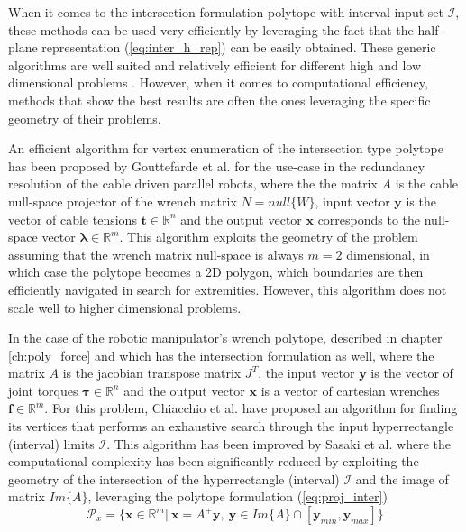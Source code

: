 When it comes to the intersection formulation polytope with interval input set $\mathcal{I}$, these methods can be used very efficiently by leveraging the fact that the half-plane representation (\ref{eq:inter_h_rep}) can be easily obtained. These generic algorithms are well suited and relatively efficient for different high and low dimensional problems \cite{avis_comparative_2015}. However, when it comes to computational efficiency, methods that show the best results are often the ones leveraging the specific geometry of their problems. 

An efficient algorithm for vertex enumeration of the intersection type polytope has been proposed by Gouttefarde et al. \cite{gouttefarde_versatile_2015} for the use-case in the redundancy resolution of the cable driven parallel robots, where the the matrix $A$ is the cable null-space projector of the wrench matrix $N=null\{W\}$, input vector $\bm{y}$ is the vector of cable tensions $\bm{t}\in\mathbb{R}^n$ and the output vector $\bm{x}$ corresponds to the null-space vector $\bm{\lambda}\in\mathbb{R}^m$. This algorithm exploits the geometry of the problem assuming that the wrench matrix null-space is always $m=2$ dimensional, in which case the polytope becomes a 2D polygon, which boundaries are then efficiently navigated in search for extremities. However, this algorithm does not scale well to higher dimensional problems.

In the case of the robotic manipulator's wrench polytope, described in chapter \ref{ch:poly_force} and which has the intersection formulation as well, where the matrix $A$ is the jacobian transpose matrix $J^T$, the input vector $\bm{y}$ is the vector of joint torques $\bm{\tau}\in\mathbb{R}^n$ and the output vector $\bm{x}$ is a vector of cartesian wrenches $\bm{f}\in\mathbb{R}^m$. For this problem, Chiacchio et al. \cite{chiacchio_evaluation_1996} have proposed an algorithm for finding its vertices that performs an exhaustive search through the input hyperrectangle (interval) limits $\mathcal{I}$. This algorithm has been improved by Sasaki et al. \cite{sasaki_vertex_nodate} where the computational complexity has been significantly reduced by exploiting the geometry of the intersection of the hyperrectangle (interval) $\mathcal{I}$ and the image of matrix $Im\{A\}$, leveraging the polytope formulation (\ref{eq:proj_inter})
\begin{equation}
\mathcal{P}_x=\{\bm{x}\in\mathbb{R}^m |~ \bm{x} = A^+\bm{y},~ \bm{y} \in Im\{A\}\cap[\bm{y}_{min},\bm{y}_{max}]\}
\label{eq:inter_hyp_inter}
\end{equation}


